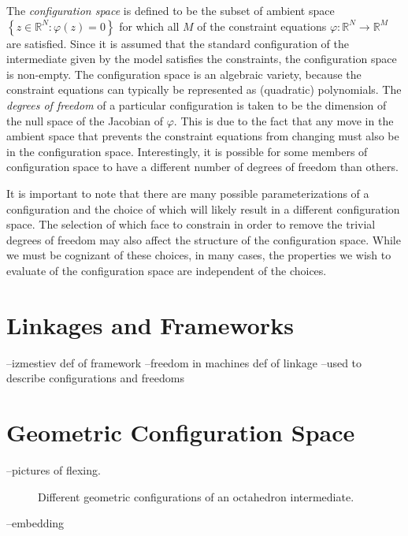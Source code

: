 The \textit{configuration space} is defined to be the subset of ambient space $\left\{z \in \mathbb{R}^N : \varphi\left(z\right) = 0\right\}$  for which all $M$ of the constraint equations $\varphi: \mathbb{R}^N \to  \mathbb{R}^M $ are satisfied.  Since it is assumed that the standard configuration of the intermediate given by the model satisfies the constraints, the configuration space is non-empty. The configuration space is an algebraic variety, because the constraint equations can typically be represented as (quadratic) polynomials.  The \textit{degrees of freedom} of a particular configuration is taken to be the dimension of the null space of the Jacobian of $\varphi$. This is due to the fact that any move in the ambient space that prevents the constraint equations from changing must also be in the configuration space. Interestingly, it is possible for some members of configuration space to have a different number of degrees of freedom than others. 
 
It is important to note that there are many possible parameterizations of a configuration and the choice of which will likely result in a different configuration space. The selection of which face to constrain in order to remove the trivial degrees of freedom may also affect the structure of the configuration space. While we must be cognizant of these choices, in many cases, the properties we wish to evaluate of the configuration space are independent of the choices.

%
%

\section{Linkages and Frameworks}
--izmestiev def of framework
--freedom in machines def of linkage
--used to describe configurations and freedoms 


\section{Geometric Configuration Space}

 --pictures of flexing. 
\begin{figure}[ht]
\caption{Different geometric configurations of an octahedron intermediate.}
\label{fig:OctaGCS}
\end{figure}
--embedding

